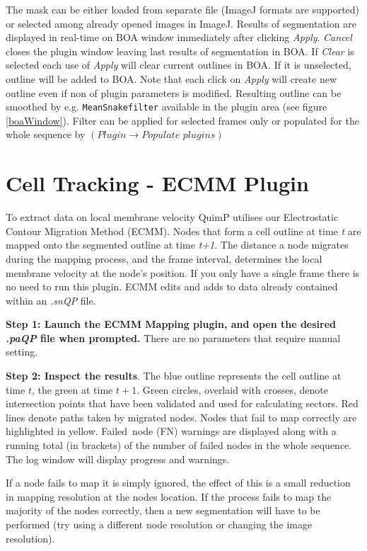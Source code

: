 \documentclass[a4paper,12pt]{article}
\begin{document}
The mask can be either loaded from separate file (ImageJ formats are supported) or selected among already opened images in ImageJ. Results of segmentation are displayed in real-time on BOA window immediately after clicking \textit{Apply}. \textit{Cancel} closes the plugin window leaving last results of segmentation in BOA. If \textit{Clear} is selected each use of \textit{Apply} will clear current outlines in BOA. If it is unselected, outline will be added to BOA. Note that each click on \textit{Apply} will create new outline even if non of plugin parameters is modified. 
Resulting outline can be smoothed by e.g. \texttt{MeanSnakefilter} available in the plugin area (see figure \ref{boaWindow}). Filter can be applied for selected frames only or populated for the whole sequence by $(\textit{Plugin}\rightarrow \textit{Populate plugins})$
 
\section{Cell Tracking - ECMM Plugin}

To extract data on local membrane velocity QuimP utilises our Electrostatic Contour Migration Method (ECMM).  
Nodes that form a cell outline at time \textit{t} are mapped onto the segmented outline at time \textit{t+1}.  The distance a node migrates
during the mapping process, and the frame interval, determines the local membrane velocity at the node's position.  If you only have a single
frame there is no need to run this plugin.  ECMM edits and adds to data 
already contained within an \textit{.snQP} file.

\textbf{Step 1: Launch the ECMM Mapping plugin, and open the desired \textit{.paQP} file when prompted.}  There are no parameters that
require manual setting.

\textbf{Step 2: Inspect the results}.  The blue outline represents the cell outline at time $t$, the green at time $t+1$.  
Green circles, overlaid with crosses, denote intersection points that have been validated and used for calculating sectors.  
Red lines denote paths taken by migrated nodes.   Nodes that fail to map correctly are highlighted in yellow.
Failed~node (FN) warnings are displayed along with a running total (in brackets) of the number of failed nodes in the whole sequence.  
The log window will display progress and warnings. 

If a node fails to map it is simply ignored, the effect of this is a small reduction in mapping resolution at the nodes location.
If the process fails to map the majority of the nodes correctly, then a new segmentation will have to be performed
(try using a different node resolution or changing the image resolution).
\end{document}
